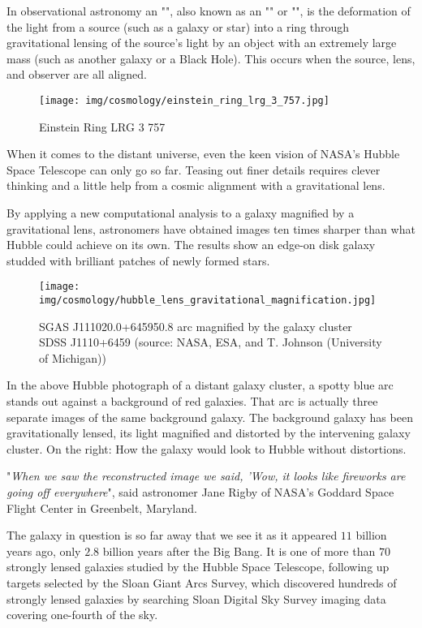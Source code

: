	In observational astronomy an "", also known as an "" or "", is the deformation of the light from a source (such as a galaxy or star) into a ring through gravitational lensing of the source's light by an object with an extremely large mass (such as another galaxy or a Black Hole). This occurs when the source, lens, and observer are all aligned.
	\begin{figure}[H]
		\centering
		\texttt{[image: img/cosmology/einstein\_ring\_lrg\_3\_757.jpg]}	
		\caption{Einstein Ring LRG 3 757}
	\end{figure}
	When it comes to the distant universe, even the keen vision of NASA's Hubble Space Telescope can only go so far. Teasing out finer details requires clever thinking and a little help from a cosmic alignment with a gravitational lens.

	By applying a new computational analysis to a galaxy magnified by a gravitational lens, astronomers have obtained images ten times sharper than what Hubble could achieve on its own. The results show an edge-on disk galaxy studded with brilliant patches of newly formed stars.
	\begin{figure}[H]
		\centering
		\texttt{[image: img/cosmology/hubble\_lens\_gravitational\_magnification.jpg]}	
		\caption[]{SGAS J111020.0+645950.8 arc magnified by the galaxy cluster SDSS J1110+6459 (source: NASA, ESA, and T. Johnson (University of Michigan))}
	\end{figure}
	In the above Hubble photograph of a distant galaxy cluster, a spotty blue arc stands out against a background of red galaxies. That arc is actually three separate images of the same background galaxy. The background galaxy has been gravitationally lensed, its light magnified and distorted by the intervening galaxy cluster. On the right: How the galaxy would look to Hubble without distortions.
	
	"\textit{When we saw the reconstructed image we said, 'Wow, it looks like fireworks are going off everywhere}", said astronomer Jane Rigby of NASA's Goddard Space Flight Center in Greenbelt, Maryland.

	The galaxy in question is so far away that we see it as it appeared $11$ billion years ago, only $2.8$ billion years after the Big Bang. It is one of more than $70$ strongly lensed galaxies studied by the Hubble Space Telescope, following up targets selected by the Sloan Giant Arcs Survey, which discovered hundreds of strongly lensed galaxies by searching Sloan Digital Sky Survey imaging data covering one-fourth of the sky.	
	
